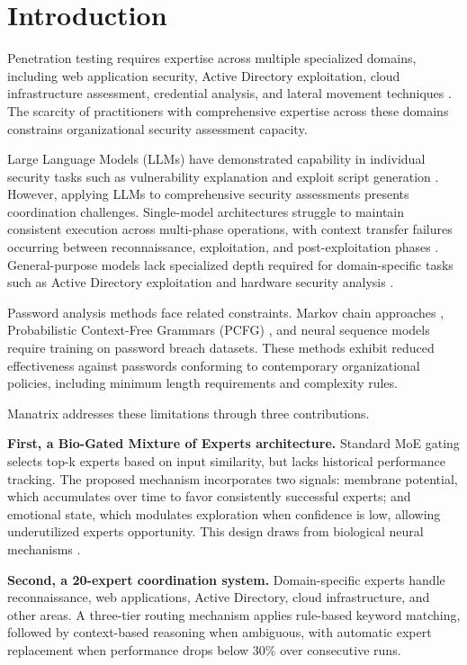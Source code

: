 \documentclass[preprint,12pt]{elsarticle}
\begin{document}
\linenumbers

\section{Introduction}
\label{sec:introduction}

Penetration testing requires expertise across multiple specialized domains, including web application security, Active Directory exploitation, cloud infrastructure assessment, credential analysis, and lateral movement techniques \cite{mettler2023}. The scarcity of practitioners with comprehensive expertise across these domains constrains organizational security assessment capacity.

Large Language Models (LLMs) have demonstrated capability in individual security tasks such as vulnerability explanation and exploit script generation \cite{hapi2023}. However, applying LLMs to comprehensive security assessments presents coordination challenges. Single-model architectures struggle to maintain consistent execution across multi-phase operations, with context transfer failures occurring between reconnaissance, exploitation, and post-exploitation phases \cite{caldara2024}. General-purpose models lack specialized depth required for domain-specific tasks such as Active Directory exploitation and hardware security analysis \cite{gupta2024}.

Password analysis methods face related constraints. Markov chain approaches \cite{ma2014}, Probabilistic Context-Free Grammars (PCFG) \cite{weir2014}, and neural sequence models \cite{melicher2016} require training on password breach datasets. These methods exhibit reduced effectiveness against passwords conforming to contemporary organizational policies, including minimum length requirements and complexity rules.

Manatrix addresses these limitations through three contributions.

\textbf{First, a Bio-Gated Mixture of Experts architecture.} Standard MoE gating selects top-k experts based on input similarity, but lacks historical performance tracking. The proposed mechanism incorporates two signals: membrane potential, which accumulates over time to favor consistently successful experts; and emotional state, which modulates exploration when confidence is low, allowing underutilized experts opportunity. This design draws from biological neural mechanisms \cite{kandel2013}.

\textbf{Second, a 20-expert coordination system.} Domain-specific experts handle reconnaissance, web applications, Active Directory, cloud infrastructure, and other areas. A three-tier routing mechanism applies rule-based keyword matching, followed by context-based reasoning when ambiguous, with automatic expert replacement when performance drops below 30\% over consecutive runs.
\end{document}
